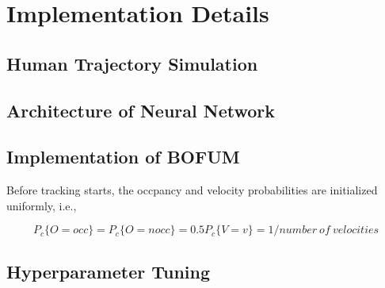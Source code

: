 \chapter{Implementation Details}

\section{Human Trajectory Simulation}

\section{Architecture of Neural Network}

\section{Implementation of BOFUM}

Before tracking starts, the occpancy and velocity probabilities are initialized uniformly, i.e.,

\[ P_c\{ O = occ \}=P_c\{O = nocc\}=0.5  P_c\{V= v \}=1/number \ of \ velocities \] 

\section{Hyperparameter Tuning}

